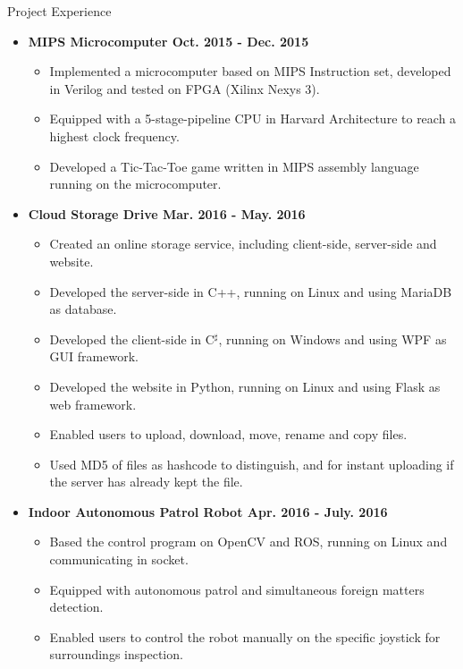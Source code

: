\documentclass[10pt,oneside]{article}
\newenvironment{ressection}[1]{
	\vspace{4pt}
	{\fontfamily{phv}\selectfont\Large#1}
	\begin{itemize}
	\vspace{3pt}
}{
	\end{itemize}
}
\newcommand{\resitem}[1]{
	\vspace{-4pt}
	\item \begin{flushleft} #1 \end{flushleft}
}
\newcommand{\ressubitem}[1]{
	\vspace{-1pt}
	\item \begin{flushleft} #1 \end{flushleft}
}
\newenvironment{reslist}[1]{
	\resitem{\textbf{#1}}
	\vspace{-5pt}
	\begin{itemize}
}{
	\end{itemize}
}
\begin{document}
\begin{ressection}{Project Experience}
	\begin{reslist}{MIPS Microcomputer \hfill Oct. 2015 - Dec. 2015}
		\ressubitem{Implemented a microcomputer based on MIPS Instruction set, developed in Verilog and tested on FPGA (Xilinx Nexys 3). }
		\ressubitem{Equipped with a 5-stage-pipeline CPU in Harvard Architecture to reach a highest clock frequency.}
		\ressubitem{Developed a Tic-Tac-Toe game written in MIPS assembly language running on the microcomputer.}
	\end{reslist}
	\begin{reslist}{Cloud Storage Drive \hfill Mar. 2016 - May. 2016}
		\ressubitem{Created an online storage service, including client-side, server-side and website.}
		\ressubitem{Developed the server-side in C++, running on Linux and using MariaDB as database.}
		\ressubitem{Developed the client-side in C$^\sharp$, running on Windows and using WPF as GUI framework.}
		\ressubitem{Developed the website in Python, running on Linux and using Flask as web framework.}
		\ressubitem{Enabled users to upload, download, move, rename and copy files.}
		\ressubitem{Used MD5 of files as hashcode to distinguish, and for instant uploading if the server has already kept the file.}
	\end{reslist}
	\begin{reslist}{Indoor Autonomous Patrol Robot \hfill Apr. 2016 - July. 2016}
		\ressubitem{Based the control program on OpenCV and ROS, running on Linux and communicating in socket.}
		\ressubitem{Equipped with autonomous patrol and simultaneous foreign matters detection.}
		\ressubitem{Enabled users to control the robot manually on the specific joystick for surroundings inspection.}
	\end{reslist}
\end{ressection}
\end{document}
